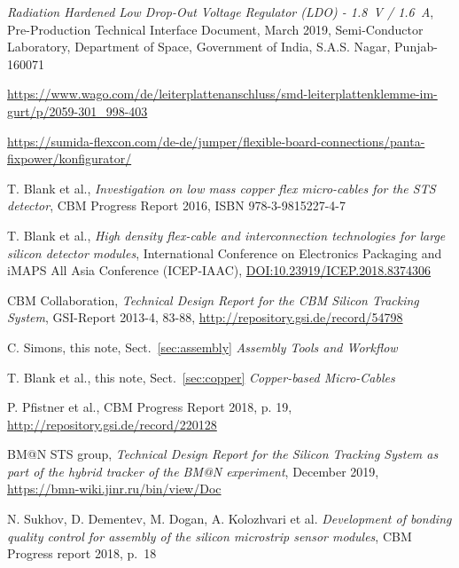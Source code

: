 \begin{thebibliography}{99}
  {\em Radiation Hardened Low Drop-Out Voltage Regulator (LDO) - 1.8~V / 1.6~A}, Pre-Production Technical Interface Document, March 2019, Semi-Conductor Laboratory, Department of Space, Government of India, S.A.S. Nagar, Punjab-160071

  \url{https://www.wago.com/de/leiterplattenanschluss/smd-leiterplattenklemme-im-gurt/p/2059-301_998-403}
	
  \url{https://sumida-flexcon.com/de-de/jumper/flexible-board-connections/panta-fixpower/konfigurator/}


 T. Blank et al., {\em Investigation on low mass copper flex micro-cables for the STS detector}, CBM Progress Report 2016, ISBN 978-3-9815227-4-7

T. Blank et al., {\em High density flex-cable and interconnection technologies for large silicon detector modules}, International Conference on Electronics Packaging and iMAPS All Asia Conference (ICEP-IAAC), \url{DOI:10.23919/ICEP.2018.8374306}



 CBM Collaboration, {\em Technical Design Report for the CBM Silicon Tracking System}, GSI-Report 2013-4, 83-88, \url{http://repository.gsi.de/record/54798}

	C. Simons, this note,  Sect.~\ref{sec:assembly} {\em Assembly Tools and Workflow}

	T. Blank et al., this note, Sect.~\ref{sec:copper} {\em Copper-based Micro-Cables\\}

	P. Pfistner et al., CBM Progress Report 2018, p. 19, \url{http://repository.gsi.de/record/220128}


	 BM@N STS group, {\em Technical Design Report for the Silicon Tracking System as part of the hybrid tracker of the BM@N experiment}, December 2019, \url{https://bmn-wiki.jinr.ru/bin/view/Doc}
	
	 N. Sukhov, D. Dementev, M. Dogan, A. Kolozhvari et al. {\em Development of bonding quality control for assembly of the silicon microstrip sensor modules}, CBM Progress report 2018, p.~18
	
\end{thebibliography} 





  
